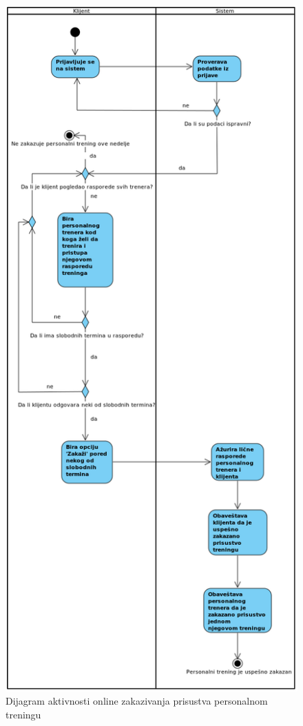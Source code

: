 \newpage
\begin{figure}[!ht]
\begin{center}
\includegraphics[scale=0.38]{sections/images/dijagram-aktivnosti-personalni-online-zakazivanje-prisustva.png}
\end{center}
\caption{Dijagram aktivnosti online zakazivanja prisustva personalnom treningu}
\label{fig:kontekst}
\end{figure}



